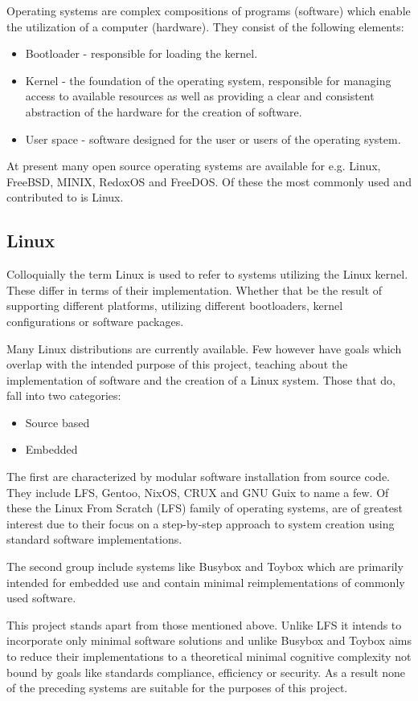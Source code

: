 Operating systems are complex compositions of programs (software) which enable the utilization of a computer (hardware). They consist of the following elements:

\begin{itemize}
    \item Bootloader - responsible for loading the kernel.
    \item Kernel - the foundation of the operating system, responsible for managing access to available resources as well as providing a clear and consistent abstraction of the hardware for the creation of software.
    \item User space - software designed for the user or users of the operating system.
\end{itemize}

At present many open source operating systems are available for e.g. Linux, FreeBSD, MINIX, RedoxOS and FreeDOS. Of these the most commonly used and contributed to is Linux.

\subsection{Linux}

Colloquially the term Linux is used to refer to systems utilizing the Linux kernel. These differ in terms of their implementation. Whether that be the result of supporting different platforms, utilizing different bootloaders, kernel configurations or software packages.

Many Linux distributions are currently available. Few however have goals which overlap with the intended purpose of this project, teaching about the implementation of software and the creation of a Linux system. Those that do, fall into two categories:

\begin{itemize}
    \item Source based
    \item Embedded
\end{itemize}

The first are characterized by modular software installation from source code. They include LFS, Gentoo, NixOS, CRUX and GNU Guix to name a few. Of these the Linux From Scratch (LFS) family of operating systems, are of greatest interest due to their focus on a step-by-step approach to system creation using standard software implementations. 

The second group include systems like Busybox and Toybox which are primarily intended for embedded use and contain minimal reimplementations of commonly used software.

This project stands apart from those mentioned above. Unlike LFS it intends to incorporate only minimal software solutions and unlike Busybox and Toybox aims to reduce their implementations to a theoretical minimal cognitive complexity not bound by goals like standards compliance, efficiency or security. As a result none of the preceding systems are suitable for the purposes of this project.
